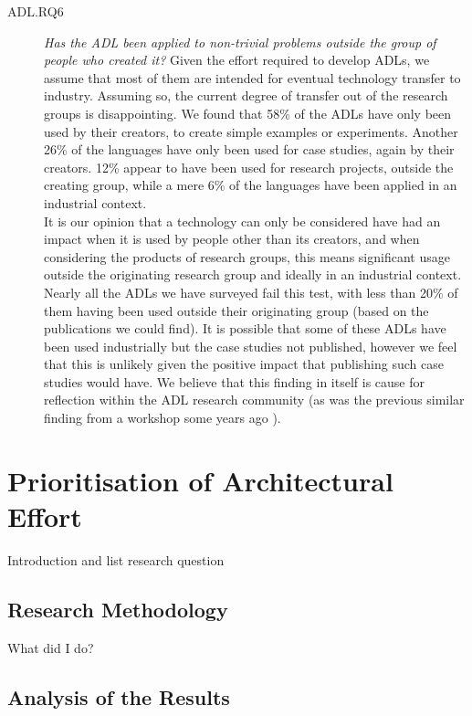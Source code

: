 \begin{description}
\item[ADL.RQ6] \emph{Has the ADL been applied to non-trivial problems outside the group of people who created it?}
Given the effort required to develop ADLs, we assume that most of them are intended for eventual technology transfer to industry.  Assuming so, the current degree of transfer out of the research groups is disappointing.  We found that 58\% of the ADLs have only been used by their creators, to create simple examples or experiments.  Another 26\% of the languages have only been used for case studies, again by their creators.  12\% appear to have been used for research projects, outside the creating group, while a mere 6\% of the languages have been applied in an industrial context. \\
It is our opinion that a technology can only be considered have had an impact when it is used by people other than its creators, and when considering the products of research groups, this means significant usage outside the originating research group and ideally in an industrial context.  Nearly all the ADLs we have surveyed fail this test, with less than 20\% of them having been used outside their originating group (based on the publications we could find).  It is possible that some of these ADLs have been used industrially but the case studies not published, however we feel that this is unlikely given the positive impact that publishing such case studies would have.  We believe that this finding in itself is cause for reflection within the ADL research community (as was the previous similar finding from a workshop some years ago \cite{woodshilliard2005-adlsinpractice}).
\end{description}



\section{Prioritisation of Architectural Effort}

Introduction and list research question

\subsection{Research Methodology}

What did I do?

\subsection{Analysis of the Results}

